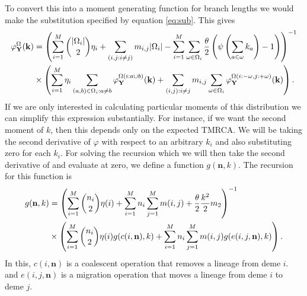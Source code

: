 To convert this into a moment generating function for branch lengths we would make the substitution specified by
equation \ref{eq:sub}. This gives 
\begin{align}
  \label{eq:gensub}
  \varphi_{\mathbf{Y}}^{\Omega}(\mathbf{k}) &=
  \left( \sum_{i=1}^M \binom{|\Omega_i|}{2}\eta_i  + \sum_{(i,j:i \neq j)} m_{i,j}|\Omega_i| -
  \sum_{i=1}^M \sum_{\omega \in \Omega_i} \frac{\theta}{2}\left( \psi\left(\sum_{a \in \omega}k_{a}\right) -1\right)\right)^{-1} \\
  &\times \left( \sum_{i=1}^M \eta_i \sum_{(a,b) \in \Omega_i:a \neq b}
  \varphi_{\mathbf{Y}}^{\Omega(i:a \cup b)}(\mathbf{k}) + 
  \sum_{(i,j):i\neq j}m_{i,j}\sum_{\omega \in \Omega_i} \varphi_{\mathbf{Y}}^{\Omega\left( i :-\omega, j: + \omega \right)}(\mathbf{k})\right).
\end{align}
If we are only interested in calculating particular moments of this distribution
we can simplify this expression substantially. For instance, if we want the
second moment of $k$, then this depends only on the expected TMRCA. We will be
taking the second derivative of $\varphi$ with respect to an arbitrary $k_i$ and
also substituting zero for each $k_i$. For solving the recursion which we will
then take the second derivative of and evaluate at zero, we define a function
$g(\mathbf{n}, k)$. The recursion for this function is
\begin{align}
  \label{eq:grecur}
  g(\mathbf{n}, k) &= \left( \sum_{i=1}^M \binom{n_i}{2}\eta(i) + \sum_{i=1}^Mn_i\sum_{j=1}^Mm(i,j) + 
    \frac{\theta}{2} \frac{k^2}{2}m_2 \right)^{-1} \nonumber \\
  &\times \left( \sum_{i=1}^M \binom{n_i}{2} \eta(i) g(c(i,\mathbf{n}), k) + 
  \sum_{i=1}^Mn_i\sum_{j=1}^Mm(i,j)g(e(i,j,\mathbf{n}),k)\right).
\end{align}
In this, $c(i,\mathbf{n})$ is a coalescent operation that removes a lineage from
deme $i$. and $e(i,j,\mathbf{n})$ is a migration operation that moves a lineage
from deme $i$ to deme $j$.

